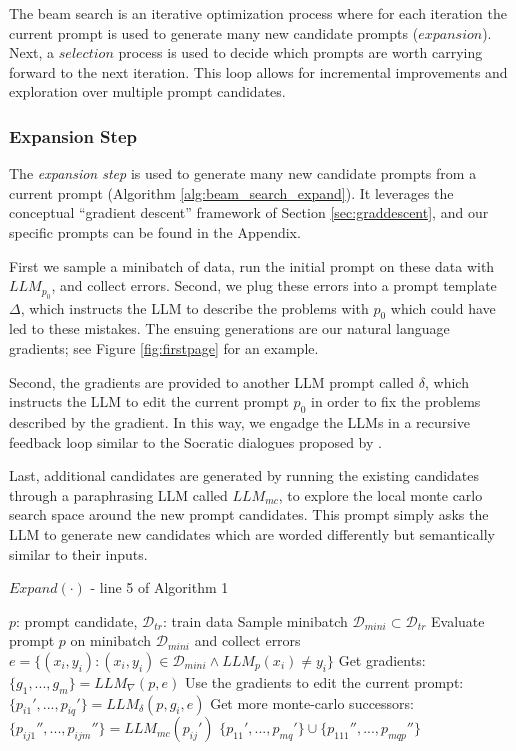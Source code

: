 The beam search is an iterative optimization process where for each iteration the current prompt is used to generate many new candidate prompts ($expansion$). 
Next, a $selection$ process is used to decide which prompts are worth carrying forward to the next iteration.
This loop allows for incremental improvements and exploration over multiple prompt candidates.

\subsubsection{Expansion Step}

The \emph{expansion step} is  used to generate many new candidate prompts from a current prompt (Algorithm \ref{alg:beam_search_expand}). It leverages the conceptual ``gradient descent'' framework of Section \ref{sec:graddescent}, and our specific prompts can be found in the Appendix.

First we sample a minibatch of data, run the initial prompt on these data with $LLM_{p_0}$, and collect errors. Second, we plug these errors into a prompt template $\Delta$, which instructs the LLM to describe the problems with $p_0$ which could have led to these mistakes. The ensuing generations are our natural language gradients; see Figure \ref{fig:firstpage} for an example. 

Second, the gradients are provided to another LLM prompt called $\delta$, which instructs the LLM to edit the current prompt $p_0$ in order to fix the problems described by the gradient. In this way, we engadge the LLMs in a recursive feedback loop similar to the Socratic dialogues proposed by \citet{zeng2022socratic}. 

Last, additional candidates are generated by running the existing candidates through a paraphrasing LLM called $LLM_{mc}$, to explore the local monte carlo search space around the new prompt candidates. This prompt simply asks the LLM to generate new candidates which are worded differently but semantically similar to their inputs.

\begin{algorithm}
\caption{$Expand(\cdot)$ - line 5 of Algorithm 1}
\label{alg:beam_search_expand}
\begin{algorithmic}[1]
\REQUIRE $p$: prompt candidate, $\mathcal{D}_{tr}$: train data
\STATE Sample minibatch $\mathcal{D}_{mini} \subset \mathcal{D}_{tr}$
\STATE Evaluate prompt $p$ on minibatch $\mathcal{D}_{mini}$ and collect errors $e = \{ (x_i, y_i) : (x_i, y_i) \in \mathcal{D}_{mini} \land LLM_{p}(x_i) \neq y_i \}$
\STATE Get gradients: $\{g_1, ..., g_m\} = LLM_{\nabla}(p, e)$
\STATE Use the gradients to edit the current prompt: $\{p_{i1}', ..., p_{iq}'\} = LLM_{\delta}(p, g_i, e)$
\STATE Get more monte-carlo successors: $\{p_{ij1}'', ..., p_{ijm}''\} = LLM_{mc}(p_{ij}')$
\RETURN $\{p_{11}', ..., p_{mq}'\} \cup \{p_{111}'', ..., p_{mqp}''\}$
\end{algorithmic}
\end{algorithm}

